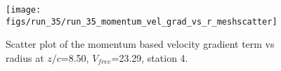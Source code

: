 \begin{figure}[H]
\centering
\texttt{[image: figs/run\_35/run\_35\_momentum\_vel\_grad\_vs\_r\_meshscatter]}
\caption{Scatter plot of the momentum based velocity gradient term vs radius at $z/c$=8.50, $V_{free}$=23.29, station 4.}
\label{fig:run_35_momentum_vel_grad_vs_r_meshscatter}
\end{figure}


